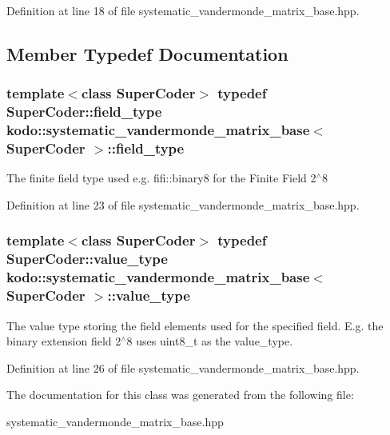 Definition at line 18 of file systematic\-\_\-vandermonde\-\_\-matrix\-\_\-base.\-hpp.



\subsection{Member Typedef Documentation}
\hypertarget{classkodo_1_1systematic__vandermonde__matrix__base_aff92406ee9428bdc2c8f56de69ff77df}{
\subsubsection[{field\-\_\-type}]{\setlength{\rightskip}{0pt plus 5cm}template$<$class Super\-Coder$>$ typedef Super\-Coder\-::field\-\_\-type {\bf kodo\-::systematic\-\_\-vandermonde\-\_\-matrix\-\_\-base}$<$ Super\-Coder $>$\-::{\bf field\-\_\-type}}}\label{classkodo_1_1systematic__vandermonde__matrix__base_aff92406ee9428bdc2c8f56de69ff77df}




The finite field type used e.\-g. fifi\-::binary8 for the Finite Field 2$^\wedge$8 

Definition at line 23 of file systematic\-\_\-vandermonde\-\_\-matrix\-\_\-base.\-hpp.

\hypertarget{classkodo_1_1systematic__vandermonde__matrix__base_ad09eed8f6a55a351b440ba830cde6e25}{
\subsubsection[{value\-\_\-type}]{\setlength{\rightskip}{0pt plus 5cm}template$<$class Super\-Coder$>$ typedef Super\-Coder\-::value\-\_\-type {\bf kodo\-::systematic\-\_\-vandermonde\-\_\-matrix\-\_\-base}$<$ Super\-Coder $>$\-::{\bf value\-\_\-type}}}\label{classkodo_1_1systematic__vandermonde__matrix__base_ad09eed8f6a55a351b440ba830cde6e25}




The value type storing the field elements used for the specified field. E.\-g. the binary extension field 2$^\wedge$8 uses uint8\-\_\-t as the value\-\_\-type. 

Definition at line 26 of file systematic\-\_\-vandermonde\-\_\-matrix\-\_\-base.\-hpp.



The documentation for this class was generated from the following file\-:\begin{DoxyCompactItemize}
\item 
systematic\-\_\-vandermonde\-\_\-matrix\-\_\-base.\-hpp\end{DoxyCompactItemize}
